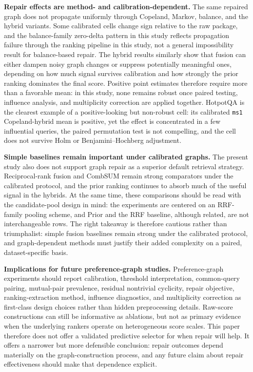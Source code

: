 \documentclass[manuscript,anonymous,review]{acmart}
\begin{document}
\textbf{Repair effects are method- and calibration-dependent.} The same repaired
graph does not propagate uniformly through Copeland, Markov, balance, and the
hybrid variants. Some calibrated cells change sign relative to the raw package,
and the balance-family zero-delta pattern in this study reflects propagation
failure through the ranking pipeline in this study, not a general impossibility
result for balance-based repair. The hybrid results similarly show that fusion can
either dampen noisy graph changes or suppress potentially meaningful ones,
depending on how much signal survives calibration and how strongly the prior
ranking dominates the final score. Positive point estimates therefore require
more than a favorable mean: in this study, none remains robust once paired
testing, influence analysis, and multiplicity correction are applied together.
HotpotQA is the clearest example of a positive-looking but non-robust cell: its calibrated \texttt{ms1} Copeland-hybrid mean is positive, yet the effect is concentrated in a few influential queries, the paired permutation test is not compelling, and the cell does not survive Holm or Benjamini--Hochberg adjustment.

\textbf{Simple baselines remain important under calibrated graphs.} The present
study also does not support graph repair as a superior default retrieval
strategy. Reciprocal-rank fusion and CombSUM remain strong comparators under the
calibrated protocol, and the prior ranking continues to absorb much of the
useful signal in the hybrids. At the same time, these comparisons should be
read with the candidate-pool design in mind: the experiments are centered on an
RRF-family pooling scheme, and Prior and the RRF baseline, although related, are
not interchangeable rows. The right takeaway is therefore cautious rather than
triumphalist: simple fusion baselines remain strong under the calibrated
protocol, and graph-dependent methods must justify their added complexity on a
paired, dataset-specific basis.

\textbf{Implications for future preference-graph studies.} Preference-graph
experiments should report calibration, threshold interpretation, common-query
pairing, mutual-pair prevalence, residual nontrivial cyclicity, repair
objective, ranking-extraction method, influence diagnostics, and multiplicity
correction as first-class design choices rather than hidden preprocessing
details. Raw-score constructions can still be informative as ablations, but not
as primary evidence when the underlying rankers operate on heterogeneous score
scales. This paper therefore does not offer a validated predictive selector for
when repair will help. It offers a narrower but more defensible conclusion:
repair outcomes depend materially on the graph-construction process, and any
future claim about repair effectiveness should make that dependence explicit.
\end{document}
